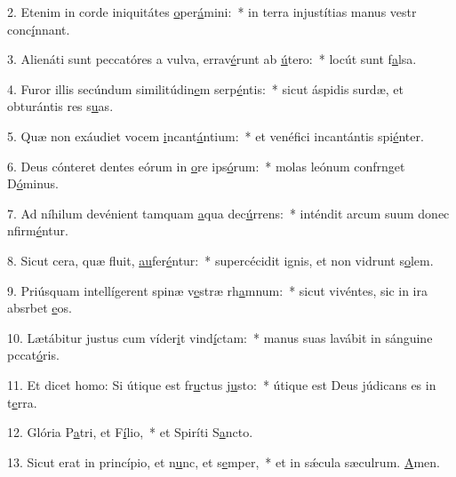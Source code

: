 2. Etenim in corde iniquitátes \uline{o}per\uline{á}mini:~* in terra injustítias manus vestr conc\uline{í}nnant.\par 
3. Alienáti sunt peccatóres a vulva, errav\uline{é}runt ab \uline{ú}tero:~* locút sunt f\uline{a}lsa.\par 
4. Furor illis secúndum similitúdin\uline{e}m serp\uline{é}ntis:~* sicut áspidis surdæ, et obturántis res s\uline{u}as.\par 
5. Quæ non exáudiet vocem \uline{i}ncant\uline{á}ntium:~* et venéfici incantántis spi\uline{é}nter.\par 
6. Deus cónteret dentes eórum in \uline{o}re ips\uline{ó}rum:~* molas leónum confrnget D\uline{ó}minus.\par 
7. Ad níhilum devénient tamquam \uline{a}qua dec\uline{ú}rrens:~* inténdit arcum suum donec nfirm\uline{é}ntur.\par 
8. Sicut cera, quæ fluit, \uline{au}fer\uline{é}ntur:~* supercécidit ignis, et non vidrunt s\uline{o}lem.\par 
9. Priúsquam intellígerent spinæ v\uline{e}stræ rh\uline{a}mnum:~* sicut vivéntes, sic in ira absrbet \uline{e}os.\par 
10. Lætábitur justus cum víder\uline{i}t vind\uline{í}ctam:~* manus suas lavábit in sánguine pccat\uline{ó}ris.\par 
11. Et dicet homo: Si útique est fr\uline{u}ctus j\uline{u}sto:~* útique est Deus júdicans es in t\uline{e}rra.\par 
12. Glória P\uline{a}tri, et F\uline{í}lio,~* et Spiríti S\uline{a}ncto.\par 
13. Sicut erat in princípio, et n\uline{u}nc, et s\uline{e}mper,~* et in sǽcula sæculrum. \uline{A}men.\par 
